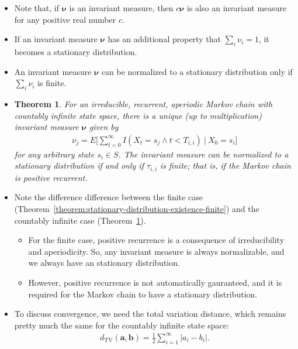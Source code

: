 \documentclass[10pt]{article}
\newtheorem{theorem}[lemma]{Theorem}
\newcommand{\ve}[1]{\mathbf{#1}}
\newcommand{\mrm}[1]{\mathrm{#1}}
\newcommand{\ves}[1]{\boldsymbol{#1}}
\begin{document}
\begin{itemize}
  \item Note that, if $\ves{\nu}$ is an invariant measure, then $c \ves{\nu}$ is also an invariant measure for any positive real number $c$.
  
  \item If an invariant measure $\ves{\nu}$ has an additional property that $\sum_{i} \nu_i = 1$, it becomes a stationary distribution.
  
  \item An invariant measure $\ves{\nu}$ can be normalized to a stationary distribution only if $\sum_{i} \nu_i$ is finite.
  
  \item \begin{theorem} \label{theorem:stationary-distribution-existence-countably-infinite}
    For an irreducible, recurrent, aperiodic Markov chain with countably infinite state space, there is a unique (up to multiplication) invariant measure $\ves{\nu}$ given by
    \begin{align*}
        \nu_j = E\bigg[ \sum_{t=0}^\infty I(X_t = s_j \wedge t < T_{i,i})\ \bigg|\ X_0 = s_i \bigg]
    \end{align*}
    for any arbitrary state $s_i \in S$. The invariant measure can be normalized to a stationary distribution if and only if $\tau_{i,i}$ is finite; that is, if the Markov chain is positive recurrent.
  \end{theorem}

  \item Note the difference difference between the finite case (Theorem~\ref{theorem:stationary-distribution-existence-finite}) and the countably infinite case (Theorem~\ref{theorem:stationary-distribution-existence-countably-infinite}).
  \begin{itemize}
    \item For the finite case, positive recurrence is a consequence of irreducibility and aperiodicity. So, any invariant measure is always normalizable, and we always have an stationary distribution.
    \item However, positive recurrence is not automatically gauranteed, and it is required for the Markov chain to have a stationary distribution.
  \end{itemize}

  \item To discuss convergence, we need the total variation distance, which remains pretty much the same for the countably infinite state space:
  \begin{align*}
      d_{\mrm{TV}}(\ve{a},\ve{b}) = \frac{1}{2} \sum_{i=1}^\infty |a_i - b_i|.
  \end{align*}
  

\end{itemize}
\end{document}
